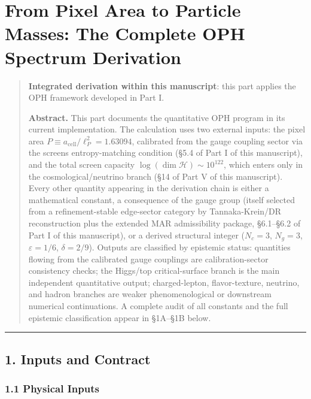 \section{From Pixel Area to Particle Masses: The Complete OPH Spectrum Derivation}\label{from-pixel-area-to-particle-masses-the-complete-oph-spectrum-derivation}

\begin{quote}
\textbf{Integrated derivation within this manuscript}: this part applies the OPH framework developed in Part I.

\textbf{Abstract.} This part documents the quantitative OPH program in its current implementation. The calculation uses two external inputs: the pixel area \(P \equiv a_{\text{cell}}/\ell_P^2 = 1.63094\), calibrated from the gauge coupling sector via the screen\textquotesingle s entropy-matching condition (§5.4 of Part I of this manuscript), and the total screen capacity \(\log(\dim\mathcal{H}) \sim 10^{122}\), which enters only in the cosmological/neutrino branch (§14 of Part V of this manuscript). Every other quantity appearing in the derivation chain is either a mathematical constant, a consequence of the gauge group (itself selected from a refinement-stable edge-sector category by Tannaka-Krein/DR reconstruction plus the extended MAR admissibility package, §6.1--§6.2 of Part I of this manuscript), or a derived structural integer (\(N_c = 3\), \(N_g = 3\), \(\varepsilon = 1/6\), \(\delta = 2/9\)). Outputs are classified by epistemic status: quantities flowing from the calibrated gauge couplings are calibration-sector consistency checks; the Higgs/top critical-surface branch is the main independent quantitative output; charged-lepton, flavor-texture, neutrino, and hadron branches are weaker phenomenological or downstream numerical continuations. A complete audit of all constants and the full epistemic classification appear in §1A--§1B below.
\end{quote}

\begin{center}\rule{0.5\linewidth}{0.5pt}\end{center}

\subsection{1. Inputs and Contract}\label{1-inputs-and-contract}

\subsubsection{1.1 Physical Inputs}\label{11-physical-inputs}

